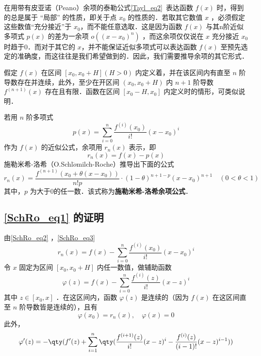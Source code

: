 
在用带有皮亚诺（Peano）余项的泰勒公式\autoref{Tayl_eq2}~表达函数 $f(x)$ 时，得到的总是属于 “局部” 的性质，即关于点 $x_0$ 的性质的．若取其它数值 $x$ ，必须假定这些数值“充分接近”于 $x_0$，而不能任意选取．这是因为函数 $f(x)$ 与其n阶近似多项式 $p(x)$ 的差为一余项 $o((x-x_0)^n)$ ，而这余项仅仅说在 $x$ 充分接近 $x_0$ 时趋于0．而对于其它的 $x$，并不能保证近似多项式可以表达函数 $f(x)$ 至预先选定的准确度，而这往往是我们希望做到的．因此，我们需要推导余项的其它形式．

假定 $f(x)$ 在区间 $[x_0,x_0+H](H>0)$ 内定义着，并在该区间内有直至 $n$ 阶导数存在并连续，此外，至少在开区间 $(x_0,x_0+H)$ 内 $n+1$ 阶导数 $f^{(n+1)}(x)$ 存在且有限．函数在区间 $[x_0-H,x_0]$ 内定义时的情形，可类似说明．

若用 $n$ 阶多项式
\begin{equation}\label{SchRo_eq2}
p(x)=\sum_{i=0}^n\frac{f^{(i)}(x_0)}{i!}(x-x_0)^i
\end{equation}
作为 $f(x)$ 的近似公式，余项用 $r_n(x)$ 表示，即 
\begin{equation}\label{SchRo_eq3}
r_n(x)=f(x)-p(x)
\end{equation}
施勒米希-洛希（O.Schl$\ddot{o}$milch-Roche）推导出下面的公式
\begin{equation}\label{SchRo_eq1}
r_n(x)=\frac{f^{(n+1)}(x_0+\theta(x-x_0))}{n!p}\cdot(1-\theta)^{n+1-p}(x-x_0)^{n+1}\quad (0<\theta<1)
\end{equation}
其中，$p$ 为大于0的任一数．该式称为\textbf{施勒米希-洛希余项公式}．
\subsection{\autoref{SchRo_eq1} 的证明}
由\autoref{SchRo_eq2} ，\autoref{SchRo_eq3} 
\begin{equation}
r_n(x)=f(x)-\sum_{i=0}^n\frac{f^{(i)}(x_0)}{i!}(x-x_0)^i
\end{equation}
令 $x$ 固定为区间 $[x_0,x_0+H]$ 内任一数值，做辅助函数
\begin{equation}
\varphi(z)=f(x)-\sum_{i=0}^n\frac{f^{(i)}(z)}{i!}(x-z)^i
\end{equation}
其中 $z\in[x_0,x]$ ．在这区间内，函数 $\varphi(z)$ 是连续的（因为 $f(x)$ 在这区间直至 $n$ 阶导数皆是连续的），且有
\begin{equation}
\varphi(x_0)=r_n(x),\quad \varphi(x)=0
\end{equation}
此外，
\begin{equation}
\varphi'(z)=-\qty(f'(z)+\sum_{i=1}^n\qty(\frac{f^{(i+1)}(z)}{i!}(x-z)^i-\frac{f^{(i)}(z)}{(i-1)!}(x-z)^{i-1}))
\end{equation}
